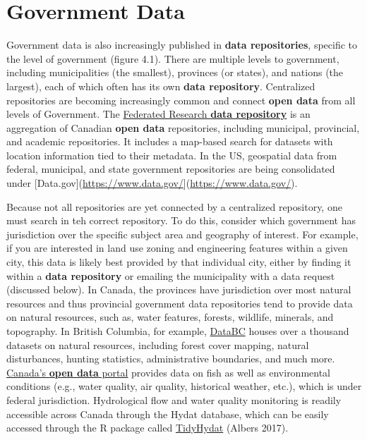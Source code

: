\documentclass[
]{book}
\begin{document}
\hypertarget{government-data}{%
\section{Government Data}\label{government-data}}

Government data is also increasingly published in \textbf{data repositories}, specific to the level of government (figure 4.1). There are multiple levels to government, including municipalities (the smallest), provinces (or states), and nations (the largest), each of which often has its own \textbf{data repository}. Centralized repositories are becoming increasingly common and connect \textbf{open data} from all levels of Government. The \href{https://www.frdr-dfdr.ca/repo/}{Federated Research \textbf{data repository}} is an aggregation of Canadian \textbf{open data} repositories, including municipal, provincial, and academic repositories. It includes a map-based search for datasets with location information tied to their metadata. In the US, geospatial data from federal, municipal, and state government repositories are being consolidated under {[}Data.gov{]}(\url{https://www.data.gov/}{]}(\url{https://www.data.gov/}).

Because not all repositories are yet connected by a centralized repository, one must search in teh correct repository. To do this, consider which government has jurisdiction over the specific subject area and geography of interest. For example, if you are interested in land use zoning and engineering features within a given city, this data is likely best provided by that individual city, either by finding it within a \textbf{data repository} or emailing the municipality with a data request (discussed below). In Canada, the provinces have jurisdiction over most natural resources and thus provincial government data repositories tend to provide data on natural resources, such as, water features, forests, wildlife, minerals, and topography. In British Columbia, for example, \href{https://www.data.gov.bc.ca/}{DataBC} houses over a thousand datasets on natural resources, including forest cover mapping, natural disturbances, hunting statistics, administrative boundaries, and much more. \href{https://open.canada.ca/en/open-data}{Canada's \textbf{open data} portal} provides data on fish as well as environmental conditions (e.g., water quality, air quality, historical weather, etc.), which is under federal jurisdiction. Hydrological flow and water quality monitoring is readily accessible across Canada through the Hydat database, which can be easily accessed through the R package called \href{https://cran.r-project.org/web/packages/tidyhydat/vignettes/tidyhydat_an_introduction.html}{TidyHydat} (Albers 2017).
\end{document}
